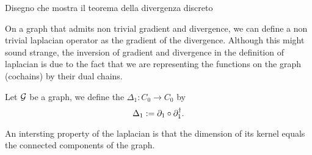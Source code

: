 \documentclass[../2.tex]{subfiles}
\begin{document}
    {\color{red} Disegno che mostra il teorema della divergenza discreto}

    On a graph that admits non trivial gradient and divergence, we can define a non trivial laplacian operator as the gradient of the divergence.
    Although this might sound strange, the inversion of gradient and divergence in the definition of laplacian is due to the fact that we are representing
    the functions on the graph (cochains) by their dual chains.

    \begin{defn}
        Let $\mathcal{G}$ be a graph, we define the  $\Delta_1 : C_0 \to C_0$ by 
        \[ \Delta_1 := \partial_1 \circ \partial^\dagger_1.\]
    \end{defn}

    An intersting property of the laplacian is that the dimension of its kernel equals the connected components of the graph.

    \newpage
\end{document}
